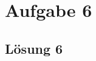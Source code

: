 \documentclass[main.tex]{subfiles}
\begin{document}
\section{Aufgabe 6}

\subsection{Lösung 6}
\end{document}
